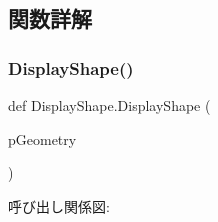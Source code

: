 \subsection{関数詳解}
\mbox{\label{namespace_display_shape_aa2cad22840c44d071824b98fd196f44d}} 
\subsubsection{\texorpdfstring{Display\+Shape()}{DisplayShape()}}
{\footnotesize\ttfamily def Display\+Shape.\+Display\+Shape (\begin{DoxyParamCaption}\item[{}]{p\+Geometry }\end{DoxyParamCaption})}

呼び出し関係図\+:
